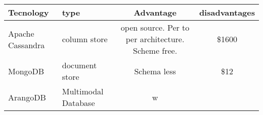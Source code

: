 \documentclass[]{article}
\begin{document}
\begin{longtable}[]{@{}llcc@{}}
\toprule
\begin{minipage}[b]{0.13\columnwidth}\raggedright
Tecnology\strut
\end{minipage} & \begin{minipage}[b]{0.17\columnwidth}\raggedright
type\strut
\end{minipage} & \begin{minipage}[b]{0.30\columnwidth}\centering
Advantage\strut
\end{minipage} & \begin{minipage}[b]{0.30\columnwidth}\centering
disadvantages\strut
\end{minipage}\tabularnewline
\midrule
\endhead
\begin{minipage}[t]{0.13\columnwidth}\raggedright
Apache Cassandra\strut
\end{minipage} & \begin{minipage}[t]{0.17\columnwidth}\raggedright
column store\strut
\end{minipage} & \begin{minipage}[t]{0.30\columnwidth}\centering
open source. Per to per architecture. Scheme free.\strut
\end{minipage} & \begin{minipage}[t]{0.30\columnwidth}\centering
\$1600\strut
\end{minipage}\tabularnewline
\begin{minipage}[t]{0.13\columnwidth}\raggedright
MongoDB\strut
\end{minipage} & \begin{minipage}[t]{0.17\columnwidth}\raggedright
document store\strut
\end{minipage} & \begin{minipage}[t]{0.30\columnwidth}\centering
Schema less\strut
\end{minipage} & \begin{minipage}[t]{0.30\columnwidth}\centering
\$12\strut
\end{minipage}\tabularnewline
\begin{minipage}[t]{0.13\columnwidth}\raggedright
ArangoDB\strut
\end{minipage} & \begin{minipage}[t]{0.17\columnwidth}\raggedright
Multimodal Database\strut
\end{minipage} & \begin{minipage}[t]{0.30\columnwidth}\centering
w\strut
\end{minipage} & \begin{minipage}[t]{0.30\columnwidth}\centering

\end{minipage}
\end{longtable}
\end{document}
